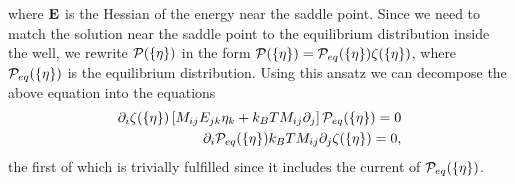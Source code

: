 where $\mathbf{E}$ is the Hessian of the energy near the saddle point.
Since we need to match the solution near the saddle point to the equilibrium distribution inside the well,
we rewrite ${\cal P}(\{\eta\})$ in the form 
${\cal P}(\{\eta\})={\cal P}_{eq}(\{\eta\})\zeta(\{\eta\})$, where ${\cal P}_{eq}(\{\eta\})$ is the equilibrium distribution. 
Using this ansatz we can decompose the above equation into the equations
\begin{equation}
\begin{split}
\label{eq:flux}
\partial_i \zeta(\{\eta\}) \left[M_{ij}E_{jk}\eta_k+k_BT M_{ij}\partial_j \right]{\cal P}_{eq}(\{\eta\})=0\\
\partial_i {\cal P}_{eq}(\{\eta\})k_BT M_{ij} \partial_j \zeta(\{\eta\})=0,
\end{split}
\end{equation}
the first of which is trivially fulfilled since it includes the current of ${\cal P}_{eq}(\{\eta\})$. 

